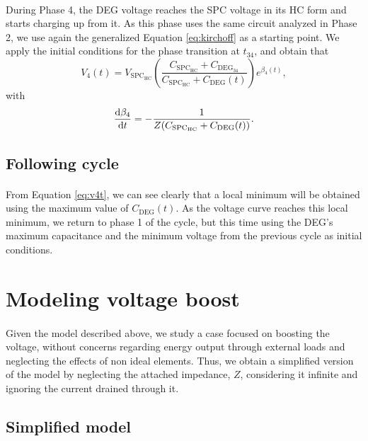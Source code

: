 \paragraph{} During Phase 4, the DEG voltage reaches the SPC voltage in its HC form and starts charging up from it. As this phase uses the same circuit analyzed in Phase 2, we use again the generalized Equation \ref{eq:kirchoff} as a starting point. We apply the initial conditions for the phase transition at $t_{34}$, and obtain that
\begin{equation}\label{eq:v4t}
V_4(t) = V_{\text{SPC}_\text{HC}}\left(\frac{C_{\text{SPC}_\text{HC}}+C_{\text{DEG}_{34}}}{C_{\text{SPC}_\text{HC}}+C_\text{DEG}(t)}\right)e^{\beta_4(t)},
\end{equation}
with
\begin{equation}
\frac{\mathrm{d}\beta_4}{\mathrm{d}t} = -\frac{1}{Z(C_{\text{SPC}_\text{HC}}+C_\text{DEG}(t))}.
\end{equation}

\subsection{Following cycle}

\paragraph{} From Equation \ref{eq:v4t}, we can see clearly that a local minimum will be obtained using the maximum value of $C_\text{DEG}(t)$.	As the voltage curve reaches this local minimum, we return to phase 1 of the cycle, but this time using the DEG's maximum capacitance and the minimum voltage from the previous cycle as initial conditions.

\section{Modeling voltage boost}

\paragraph{} Given the model described above, we study a case focused on boosting the voltage, without concerns regarding energy output through external loads and neglecting the effects of non ideal elements. Thus, we obtain a simplified version of the model by  neglecting  the attached impedance, $Z$, considering it infinite and ignoring the current drained through it.

\subsection{Simplified model}\label{sec:noload}

